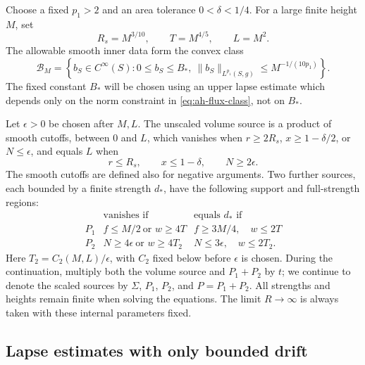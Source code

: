 Choose a fixed \(p_1>2\) and an area tolerance \(0<\delta<1/4\).
For a large finite height \(M\), set
\begin{equation}\label{eq:ah-parameter-scales}
 R_s=M^{3/10},\qquad T=M^{4/5},\qquad L=M^2.
\end{equation}
The allowable smooth inner data form the convex class
\begin{equation}\label{eq:ah-flux-class}
 \mathcal B_M=
 \left\{b_S\in C^\infty(S):
 0\le b_S\le B_*,\
 \|b_S\|_{L^{p_1}(S,g)}\le M^{-1/(10p_1)}\right\}.
\end{equation}
The fixed constant \(B_*\) will be chosen using an upper lapse
estimate which depends only on the norm constraint in
\eqref{eq:ah-flux-class}, not on \(B_*\).

Let \(\epsilon>0\) be chosen after \(M,L\).  The unscaled volume
source is a product of smooth cutoffs, between \(0\) and \(L\),
which vanishes when \(r\ge2R_s\), \(x\ge1-\delta/2\), or
\(N\le\epsilon\), and equals \(L\) when
\[
 r\le R_s,\qquad x\le1-\delta,\qquad N\ge2\epsilon .
\]
The smooth cutoffs are defined also for negative arguments.
Two further sources, each bounded by a finite strength \(d_*\),
have the following support and full-strength regions:
\begin{equation}\label{eq:ah-penalty-cutoffs}
 \begin{array}{c|c|c}
 &\text{vanishes if}&\text{equals }d_*\text{ if}\\ \hline
 P_1& f\le M/2\ \text{or }w\ge4T&
       f\ge3M/4,\quad w\le2T\\
 P_2& N\ge4\epsilon\ \text{or }w\ge4T_2&
       N\le3\epsilon,\quad w\le2T_2 .
 \end{array}
\end{equation}
Here \(T_2=C_2(M,L)/\epsilon\), with \(C_2\) fixed below before
\(\epsilon\) is chosen.  During the continuation, multiply both
the volume source and \(P_1+P_2\) by \(t\); we continue to denote
the scaled sources by \(\Sigma\), \(P_1\), \(P_2\),
and \(P=P_1+P_2\).
All strengths and heights remain finite when solving the equations.
The limit \(R\to\infty\) is always taken with these internal
parameters fixed.

\subsection{Lapse estimates with only bounded drift}

